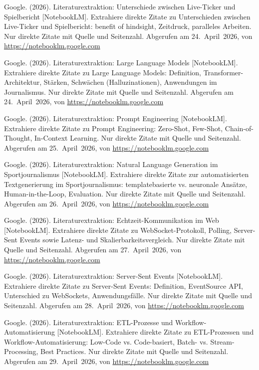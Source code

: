 \begin{description}[leftmargin=0pt, itemsep=0.6em]
\item Google. (2026). Literaturextraktion: Unterschiede zwischen Live-Ticker und Spielbericht [NotebookLM]. \glqq{}Extrahiere direkte Zitate zu Unterschieden zwischen Live-Ticker und Spielbericht: benefit of hindsight, Zeitdruck, paralleles Arbeiten. Nur direkte Zitate mit Quelle und Seitenzahl.\grqq{} Abgerufen am 24.~April~2026, von \url{https://notebooklm.google.com}

\item Google. (2026). Literaturextraktion: Large Language Models [NotebookLM]. \glqq{}Extrahiere direkte Zitate zu Large Language Models: Definition, Transformer-Architektur, Stärken, Schwächen (Halluzinationen), Anwendungen im Journalismus. Nur direkte Zitate mit Quelle und Seitenzahl.\grqq{} Abgerufen am 24.~April~2026, von \url{https://notebooklm.google.com}

\item Google. (2026). Literaturextraktion: Prompt Engineering [NotebookLM]. \glqq{}Extrahiere direkte Zitate zu Prompt Engineering: Zero-Shot, Few-Shot, Chain-of-Thought, In-Context Learning. Nur direkte Zitate mit Quelle und Seitenzahl.\grqq{} Abgerufen am 25.~April~2026, von \url{https://notebooklm.google.com}

\item Google. (2026). Literaturextraktion: Natural Language Generation im Sportjournalismus [NotebookLM]. \glqq{}Extrahiere direkte Zitate zur automatisierten Textgenerierung im Sportjournalismus: templatebasierte vs. neuronale Ansätze, Human-in-the-Loop, Evaluation. Nur direkte Zitate mit Quelle und Seitenzahl.\grqq{} Abgerufen am 26.~April~2026, von \url{https://notebooklm.google.com}

\item Google. (2026). Literaturextraktion: Echtzeit-Kommunikation im Web [NotebookLM]. \glqq{}Extrahiere direkte Zitate zu WebSocket-Protokoll, Polling, Server-Sent Events sowie Latenz- und Skalierbarkeitsvergleich. Nur direkte Zitate mit Quelle und Seitenzahl.\grqq{} Abgerufen am 27.~April~2026, von \url{https://notebooklm.google.com}

\item Google. (2026). Literaturextraktion: Server-Sent Events [NotebookLM]. \glqq{}Extrahiere direkte Zitate zu Server-Sent Events: Definition, EventSource API, Unterschied zu WebSockets, Anwendungsfälle. Nur direkte Zitate mit Quelle und Seitenzahl.\grqq{} Abgerufen am 28.~April~2026, von \url{https://notebooklm.google.com}

\item Google. (2026). Literaturextraktion: ETL-Prozesse und Workflow-Automatisierung [NotebookLM]. \glqq{}Extrahiere direkte Zitate zu ETL-Prozessen und Workflow-Automatisierung: Low-Code vs. Code-basiert, Batch- vs. Stream-Processing, Best Practices. Nur direkte Zitate mit Quelle und Seitenzahl.\grqq{} Abgerufen am 29.~April~2026, von \url{https://notebooklm.google.com}


\end{description}
